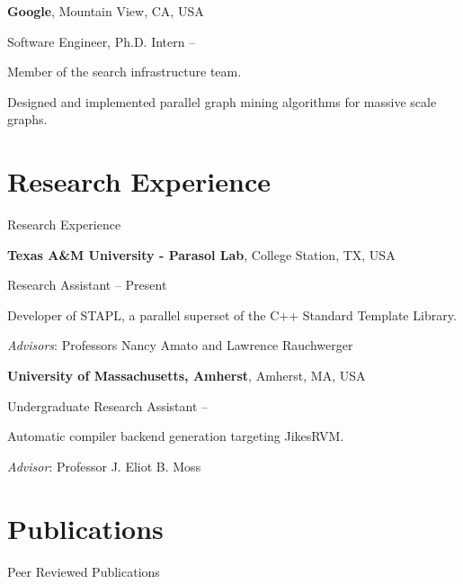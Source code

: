 \documentclass[a4paper,10pt,oneside]{article}
\begin{document}
\begin{body}
\textbf{Google},
Mountain View, CA, USA
\par
Software Engineer, Ph.D. Intern
\hfill
{} --
\begin{detail}
Member of the search infrastructure team.
\par
 Designed and implemented parallel graph mining algorithms for massive scale graphs.
 \par
\end{detail}



\section{Research Experience}
{Research Experience}

\textbf{Texas A\&M University - Parasol Lab}, College Station, TX, USA
\par
Research Assistant
\hfill
{} --
Present
\begin{detail}
Developer of STAPL, a parallel superset of the C++ Standard Template Library.
\par
\emph{Advisors}: Professors Nancy Amato and Lawrence Rauchwerger
\par
\end{detail}
\EntryGap

\textbf{University of Massachusetts, Amherst}, Amherst, MA, USA
\par
Undergraduate Research Assistant
\hfill
{} --
\begin{detail}
Automatic compiler backend generation targeting JikesRVM.
\par
\emph{Advisor}: Professor J. Eliot B. Moss
\par
\end{detail}



\section{Publications}
{Peer Reviewed Publications}

%


\end{body}
\end{document}
